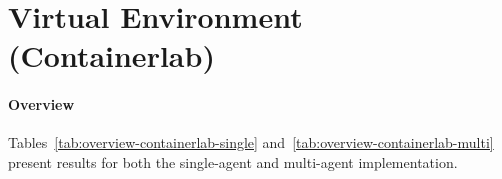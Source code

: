 \section{Virtual Environment (Containerlab)}\label{sec:eval-containerlab}

\paragraph{Overview}

Tables~\ref{tab:overview-containerlab-single} and~\ref{tab:overview-containerlab-multi} present
results for both the single-agent and multi-agent implementation.

\begin{table}[H]
    \caption{Benchmark Results --- Containerlab, Single-Agent ($n = 10$ runs each)}
    \centering
    \label{tab:overview-containerlab-single}
\end{table}

